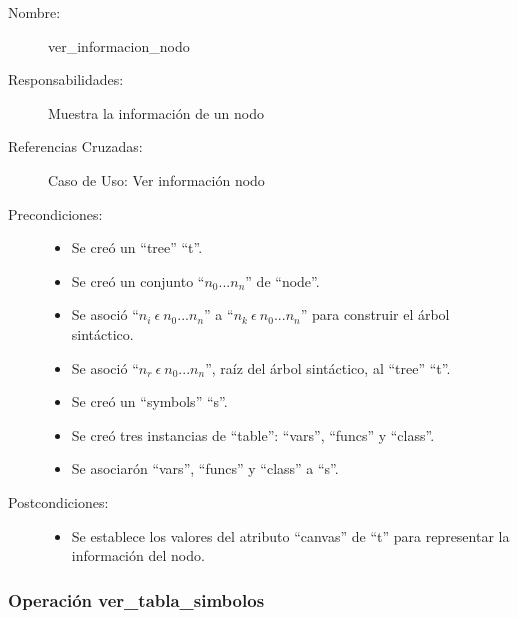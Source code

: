 	\begin{description}
		\item [Nombre:] ver\_informacion\_nodo
		\item [Responsabilidades:] Muestra la información de un nodo
		\item [Referencias Cruzadas: ] Caso de Uso: Ver información nodo
      \item [Precondiciones:] \hfill
         \begin {itemize}
         \item Se creó un ``tree'' ``t''.
         \item Se creó un conjunto ``$n_0...n_n$'' de ``node''.
         \item Se asoció ``$n_i\ \epsilon\ n_0...n_n$'' a ``$n_k\ \epsilon\ n_0...n_n$'' para construir el árbol sintáctico.
         \item Se asoció  ``$n_r\ \epsilon\ n_0...n_n$'', raíz del árbol sintáctico, al ``tree'' ``t''.
         \item Se creó un ``symbols'' ``s''.
         \item Se creó tres instancias de ``table'': ``vars'', ``funcs'' y ``class''.
         \item Se asociarón ``vars'', ``funcs'' y ``class'' a ``s''.
      \end{itemize}
      \item [Postcondiciones:] \hfill
      \begin {itemize}
         \item Se establece los valores del atributo ``canvas'' de ``t'' para representar la información del nodo.
      \end{itemize}
	\end{description} 


\subsubsection{Operación ver\_tabla\_simbolos}

